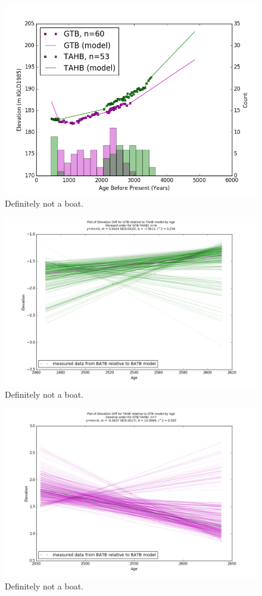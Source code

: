 \documentclass{article}
\begin{document}
\begin{figure}[h]
	\includegraphics[width=\linewidth]{data/GTB-TAHB_DataAndModel.png}
	\caption{Definitely not a boat.}
	\label{fig:data_GTBxTAHB}
\end{figure}
\newpage

\begin{figure}[h]
	\includegraphics[width=\linewidth]{data/gias/theGIA_GTB_relative_to_TAHB.png}
	\caption{Definitely not a boat.}
	\label{fig:gias_GTBxTAHB}
\end{figure}
\newpage


\begin{figure}[h]
	\includegraphics[width=\linewidth]{data/gias/theGIA_TAHB_relative_to_GTB.png}
	\caption{Definitely not a boat.}
	\label{fig:gias_TAHBxGTB}
\end{figure}
\newpage
\end{document}
